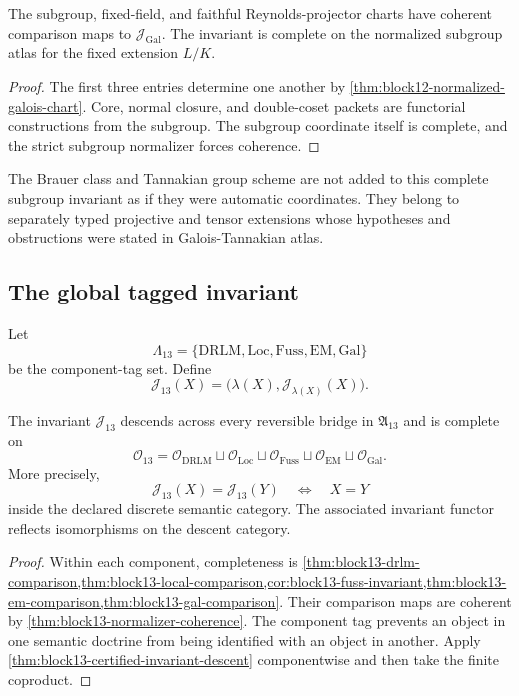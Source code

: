\begin{theorem}
\label{thm:block13-gal-comparison}
The subgroup, fixed-field, and faithful Reynolds-projector charts have coherent comparison maps to \(\mathcal J_{\mathrm{Gal}}\).  The invariant is complete on the normalized subgroup atlas for the fixed extension \(L/K\).
\end{theorem}

\begin{proof}
The first three entries determine one another by \cref{thm:block12-normalized-galois-chart}.  Core, normal closure, and double-coset packets are functorial constructions from the subgroup.  The subgroup coordinate itself is complete, and the strict subgroup normalizer forces coherence.
\end{proof}

The Brauer class and Tannakian group scheme are not added to this complete subgroup invariant as if they were automatic coordinates.  They belong to separately typed projective and tensor extensions whose hypotheses and obstructions were stated in Galois-Tannakian atlas.

\subsection{The global tagged invariant}
\label{subsec:block13-global-tagged}

Let
\[
 \Lambda_{13}
 =
 \{\mathrm{DRLM},\mathrm{Loc},\mathrm{Fuss},\mathrm{EM},\mathrm{Gal}\}
\]
be the component-tag set.  Define
\[
 \mathcal J_{13}(X)
 =
 \bigl(\lambda(X),\mathcal J_{\lambda(X)}(X)\bigr).
\]

\begin{theorem}
\label{thm:block13-global-completeness}
The invariant \(\mathcal J_{13}\) descends across every reversible bridge in \(\mathfrak A_{13}\) and is complete on
\[
 \mathcal O_{13}
 =
 \mathcal O_{\mathrm{DRLM}}
 \sqcup
 \mathcal O_{\mathrm{Loc}}
 \sqcup
 \mathcal O_{\mathrm{Fuss}}
 \sqcup
 \mathcal O_{\mathrm{EM}}
 \sqcup
 \mathcal O_{\mathrm{Gal}}.
\]
More precisely,
\[
 \boxed{
 \mathcal J_{13}(X)=\mathcal J_{13}(Y)
 \quad\Longleftrightarrow\quad
 X=Y
 }
\]
inside the declared discrete semantic category.  The associated invariant functor reflects isomorphisms on the descent category.
\end{theorem}

\begin{proof}
Within each component, completeness is \cref{thm:block13-drlm-comparison,thm:block13-local-comparison,cor:block13-fuss-invariant,thm:block13-em-comparison,thm:block13-gal-comparison}.  Their comparison maps are coherent by \cref{thm:block13-normalizer-coherence}.  The component tag prevents an object in one semantic doctrine from being identified with an object in another.  Apply \cref{thm:block13-certified-invariant-descent} componentwise and then take the finite coproduct.
\end{proof}

